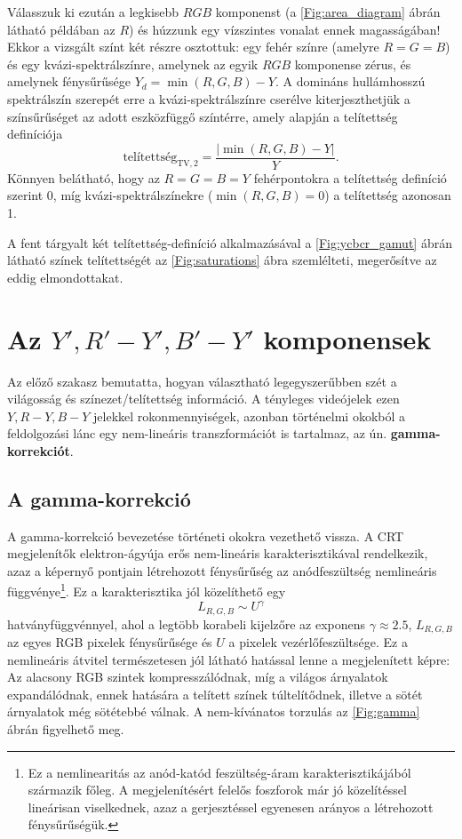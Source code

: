 \begin{itemize}
Válasszuk ki ezután a legkisebb $RGB$ komponenst (a \ref{Fig:area_diagram} ábrán látható példában az $R$) és húzzunk egy vízszintes vonalat ennek magasságában!
Ekkor a vizsgált színt két részre osztottuk: egy fehér színre (amelyre $R=G=B$) és egy kvázi-spektrálszínre, amelynek az egyik $RGB$ komponense zérus, és amelynek fénysűrűsége $Y_d = \min (R,G,B) - Y$.
A domináns hullámhosszú spektrálszín szerepét erre a kvázi-spektrálszínre cserélve kiterjeszthetjük a színsűrűséget az adott eszközfüggő színtérre, amely alapján a telítettség definíciója
\begin{equation}
\text{telítettség}_{\mathrm{TV},2} = \frac{| \min(R,G,B) - Y |}{Y}.
\label{eq:saturation_2}
\end{equation}
Könnyen belátható, hogy az $R = G=B=Y$ fehérpontokra a telítettség definíció szerint 0, míg kvázi-spektrálszínekre ($\min(R,G,B) = 0$) a telítettség azonosan 1.
\end{itemize}
A fent tárgyalt két telítettség-definíció alkalmazásával a \ref{Fig:ycbcr_gamut} ábrán látható színek telítettségét az \ref{Fig:saturations} ábra szemlélteti, megerősítve az eddig elmondottakat.
%
\section{Az $Y', R'-Y', B'-Y'$ komponensek}

Az előző szakasz bemutatta, hogyan választható legegyszerűbben szét a világosság és színezet/telítettség információ.
A tényleges videójelek ezen $Y, R-Y, B-Y$ jelekkel rokonmennyiségek, azonban történelmi okokból a feldolgozási lánc egy nem-lineáris transzformációt is tartalmaz, az ún. \textbf{gamma-korrekciót}.

\subsection{A gamma-korrekció}
A gamma-korrekció bevezetése történeti okokra vezethető vissza.
A CRT megjelenítők elektron-ágyúja erős nem-lineáris karakterisztikával rendelkezik, azaz a képernyő pontjain létrehozott fénysűrűség az anódfeszültség nemlineáris függvénye\footnote{Ez a nemlinearitás az anód-katód feszültség-áram karakterisztikájából származik főleg.
A megjelenítésért felelős foszforok már jó közelítéssel lineárisan viselkednek, azaz a gerjesztéssel egyenesen arányos a létrehozott fénysűrűségük.}.
Ez a karakterisztika jól közelíthető egy 
\begin{equation}
L_{R,G,B} \sim U^{\gamma}
\end{equation} 
hatványfüggvénnyel, ahol a legtöbb korabeli kijelzőre az exponens $\gamma \approx 2.5$, $L_{R,G,B}$ az egyes RGB pixelek fénysűrűsége és $U$ a pixelek vezérlőfeszültsége.
Ez a nemlineáris átvitel természetesen jól látható hatással lenne a megjelenített képre:
Az alacsony RGB szintek kompresszálódnak, míg a világos árnyalatok expandálódnak, ennek hatására a telített színek túltelítődnek, illetve a sötét árnyalatok még sötétebbé válnak.
A nem-kívánatos torzulás az \ref{Fig:gamma} ábrán figyelhető meg.

